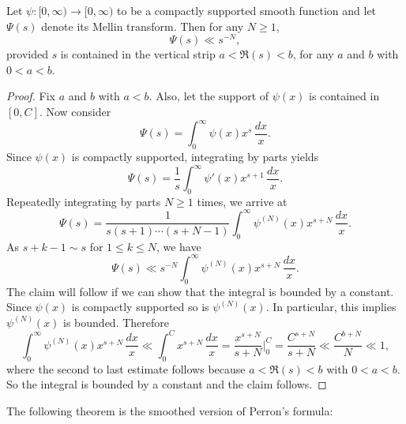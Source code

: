       \begin{proposition}\label{prop:smoothing_function_Mellin_inverse_vertical_strips}
        Let $\psi:[0,\infty) \to [0,\infty)$ to be a compactly supported smooth function and let $\Psi(s)$ denote its Mellin transform. Then for any $N \ge 1$,
        \[
          \Psi(s) \ll s^{-N},
        \]
        provided $s$ is contained in the vertical strip $a < \Re(s) < b$, for any $a$ and $b$ with $0 < a < b$.
      \end{proposition}
      \begin{proof}
        Fix $a$ and $b$ with $a < b$. Also, let the support of $\psi(x)$ is contained in $[0,C]$. Now consider
        \[
          \Psi(s) = \int_{0}^{\infty}\psi(x)x^{s}\,\frac{dx}{x}.
        \]
        Since $\psi(x)$ is compactly supported, integrating by parts yields
        \[
          \Psi(s) = \frac{1}{s}\int_{0}^{\infty}\psi'(x)x^{s+1}\,\frac{dx}{x}.
        \]
        Repeatedly integrating by parts $N \ge 1$ times, we arrive at
        \[
          \Psi(s) = \frac{1}{s(s+1) \cdots (s+N-1)}\int_{0}^{\infty}\psi^{(N)}(x)x^{s+N}\,\frac{dx}{x}.
        \]
        As $s+k-1 \sim s$ for $1 \le k \le N$, we have
        \[
          \Psi(s) \ll s^{-N}\int_{0}^{\infty}\psi^{(N)}(x)x^{s+N}\,\frac{dx}{x}.
        \]
        The claim will follow if we can show that the integral is bounded by a constant. Since $\psi(x)$ is compactly supported so is $\psi^{(N)}(x)$. In particular, this implies $\psi^{(N)}(x)$ is bounded. Therefore
        \[
          \int_{0}^{\infty}\psi^{(N)}(x)x^{s+N}\,\frac{dx}{x} \ll \int_{0}^{C}x^{s+N}\,\frac{dx}{x} = \frac{x^{s+N}}{s+N}\bigg|_{0}^{C} = \frac{C^{s+N}}{s+N} \ll \frac{C^{b+N}}{N} \ll 1,
        \]
        where the second to last estimate follows because $a < \Re(s) < b$ with $0 < a < b$. So the integral is bounded by a constant and the claim follows.
      \end{proof}
      
      The following theorem is the smoothed version of Perron's formula:


